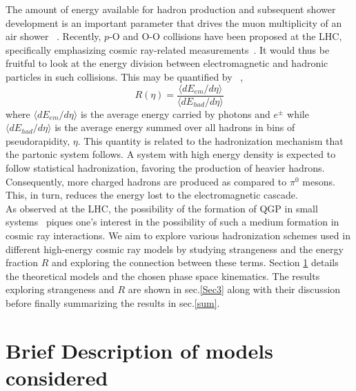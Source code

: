 \documentclass[aps,twocolumn,nofootinbib]{revtex4-1}
\begin{document}
The amount of energy available for hadron production and subsequent shower development is an important parameter that drives the muon multiplicity of an air shower ~\cite{Ulrich:2010rg,Pierog:2006qv,Cazon:2018gww,Baur:2019cpv}. Recently, $p$-O and O-O collisions have been proposed at the LHC, specifically emphasizing cosmic ray-related measurements~\cite{Brewer:2021kiv}. It would thus be fruitful to look at the energy division between electromagnetic and hadronic particles in such collisions. This may be quantified by ~\cite{Perlin:2021rwh,Baur:2019cpv},
\begin{equation}
\label{eq1}
    R(\eta) = \frac{\langle dE_{em}/d\eta \rangle}{\langle dE_{had}/d\eta \rangle}
\end{equation}
where $\langle dE_{em}/d\eta \rangle$ is the average energy carried by photons and $e^\pm$ while $\langle dE_{had}/d\eta \rangle$ is the average energy summed over all hadrons in bins of pseudorapidity, $\eta$. This quantity is related to the hadronization mechanism that the partonic system follows. A system with high energy density is expected to follow statistical hadronization, favoring the production of heavier hadrons. Consequently, more charged hadrons are produced as compared to $\pi^0$ mesons. This, in turn, reduces the energy lost to the electromagnetic cascade.\\

As observed at the LHC, the possibility of the formation of QGP in small systems~\cite{ALICE:2016fzo,CMS:2010ifv,CMS:2016fnw,PHENIX:2017djs} piques one's interest in the possibility of such a medium formation in cosmic ray interactions. We aim to explore various hadronization schemes used in different high-energy cosmic ray models by studying strangeness and the energy fraction $R$ and exploring the connection between these terms. 
Section \ref{sec2} details the theoretical models and the chosen phase space kinematics. The results exploring strangeness and $R$ are shown in sec.\ref{Sec3} along with their discussion before finally summarizing the results in sec.\ref{sum}. 



\section{Brief Description of models considered}
\label{sec2}
\end{document}
